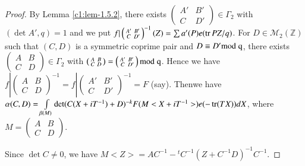 \begin{proof}
By Lemma \ref{c1:lem-1.5.2}, there exists $\left(\begin{smallmatrix} A' &
  B'\\ C & D'
\end{smallmatrix}\right)\in\Gamma_{2}$ with $(\det A',q)=1$ and we put
$f|\left(\begin{smallmatrix} A' & B'\\ C & D'
\end{smallmatrix}\right)^{-1}(Z)=\sum a'(P)e(\operatorname{tr} PZ/q)$. For
$D\in\mathscr{M}_{2}(\mathbb{Z})$ such that $(C,D)$ is a symmetric
coprime pair and $D\equiv D'\rm{mod} \; q$, there exists
$\left(\begin{smallmatrix} A & B\\ C & D
\end{smallmatrix}\right)\in\Gamma_{2}$ with $\left(\begin{smallmatrix}
  A & B\\ C & D\end{smallmatrix}\right)=\left(\begin{smallmatrix} A' &
    B'\\ C & D'  \end{smallmatrix}\right)\rm{mod} \; q$. Hence we have
  $f|\left(\begin{smallmatrix} A & B\\ C & D
  \end{smallmatrix}\right)^{-1}=f|\left(\begin{smallmatrix} A' &
    B'\\ C & D'  \end{smallmatrix}\right)^{-1}=F$ (say).
Then\pageoriginale we have $\alpha(C,D)=\int\limits_{\beta(M)}\det
(C(X+iT^{-1})+D)^{-k}F(M<X+iT^{-1}>)e(-\operatorname{tr}(TX))dX$, where
$M=\left(\begin{smallmatrix} A & B\\ C & D
\end{smallmatrix}\right)$.

Since $\det C\neq 0$, we have
$M<Z>=AC^{-1}-{}^{t}C^{-1}(Z+C^{-1}D)^{-1}C^{-1}$.


\end{proof}
